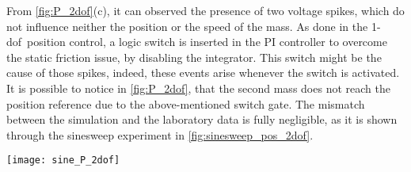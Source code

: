 From \cref{fig:P_2dof}(c), it can observed the presence of two voltage spikes, which do not influence neither the position or the speed of the mass. As done in the \acrshort{1-dof}\ position control, a logic switch is inserted in the PI controller to overcome the static friction issue, by disabling the integrator. This switch might be the cause of those spikes, indeed, these events arise whenever the switch is activated. 
It is possible to notice in \cref{fig:P_2dof}, that the second mass does not reach the position reference due to the above-mentioned switch gate.
The mismatch between the simulation and the laboratory data is fully negligible, as it is shown through the sinesweep experiment in \cref{fig:sinesweep_pos_2dof}.
\begin{figure*}[h]
	\centering
	\texttt{[image: sine\_P\_2dof]}
	\caption{Sineweep experiment from $0.1\ Hz$ to $1\ Hz$ in $100\ s$}
	\label{fig:sinesweep_pos_2dof}
\end{figure*}